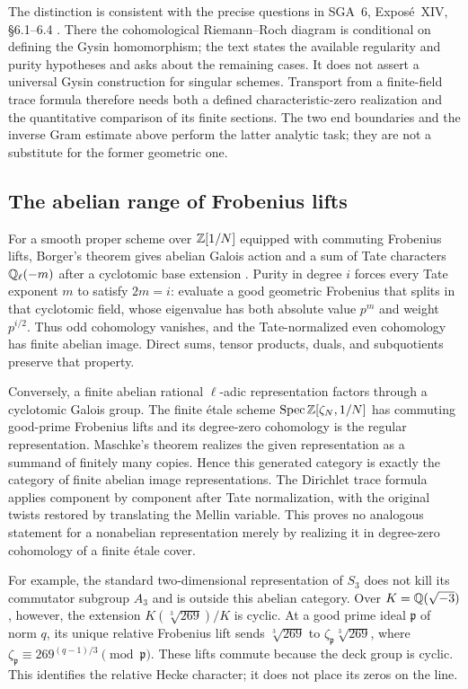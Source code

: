The distinction is consistent with the precise questions in
SGA~6, Expos\'e~XIV, \S6.1--6.4
\citep[pp.~682--685]{sga6}. There the cohomological Riemann--Roch
diagram is conditional on defining the Gysin homomorphism; the text
states the available regularity and purity hypotheses and asks about
the remaining cases. It does not assert a universal Gysin construction
for singular schemes. Transport from a finite-field trace formula
therefore needs both a defined characteristic-zero realization and
the quantitative comparison of its finite sections. The two end
boundaries and the inverse Gram estimate above perform the latter
analytic task; they are not a substitute for the former geometric one.

\subsection{The abelian range of Frobenius lifts}
For a smooth proper scheme over $\mathbb Z[1/N]$ equipped with commuting
Frobenius lifts, Borger's theorem gives abelian Galois action and a
sum of Tate characters $\mathbb Q_\ell(-m)$ after a cyclotomic base extension
\citep[Theorem~0.1 and Corollary~6.2]{borger2009}. Purity in degree
$i$ forces every Tate exponent $m$ to satisfy $2m=i$: evaluate a
good geometric Frobenius that splits in that cyclotomic field, whose eigenvalue
has both absolute value $p^m$ and weight $p^{i/2}$. Thus odd
cohomology vanishes, and the Tate-normalized even cohomology has
finite abelian image. Direct sums, tensor products, duals, and
subquotients preserve that property.

Conversely, a finite abelian rational $\ell$-adic representation
factors through a cyclotomic Galois group. The finite \hbox{\'etale}
scheme $\operatorname{Spec}\mathbb Z[\zeta_N,1/N]$ has commuting good-prime
Frobenius lifts and its degree-zero cohomology is the regular
representation. Maschke's theorem realizes the given representation
as a summand of finitely many copies. Hence this generated category
is exactly the category of finite abelian image representations.
The Dirichlet trace formula applies component by component after
Tate normalization, with the original twists restored by translating
the Mellin variable. This proves no analogous statement for a
nonabelian representation merely by realizing it in degree-zero
cohomology of a finite \hbox{\'etale} cover.

For example, the standard two-dimensional representation of $S_3$
does not kill its commutator subgroup $A_3$ and is outside this
abelian category. Over $K=\mathbb Q(\sqrt{-3})$, however, the extension
$K(\sqrt[3]{269})/K$ is cyclic. At a good prime ideal $\mathfrak p$
of norm $q$, its unique relative Frobenius lift sends
$\sqrt[3]{269}$ to $\zeta_\mathfrak p\sqrt[3]{269}$, where
$\zeta_\mathfrak p\equiv269^{(q-1)/3}\pmod{\mathfrak p}$.
These lifts commute because the deck group is cyclic. This identifies
the relative Hecke character; it does not place its zeros on the line.

